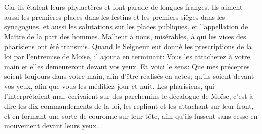 Car ils étalent leurs phylactères et font parade de longues franges.
Ils aiment aussi les premières places dans les festins
	et les premiers sièges dans les synagogues,
	et aussi les salutations sur les places publiques,
	et l’appellation de Maître de la part des hommes.
Malheur à nous, misérables, à qui les vices des pharisiens ont été transmis.
Quand le Seigneur eut donné les prescriptions de la loi
		par l’entremise de Moïse,
	il ajouta en terminant:
	Vous les attacherez à votre main et elles demeureront devant vos yeux.
Et voici le sens:
	Que mes préceptes soient toujours dans votre main,
		afin d’être réalisés en actes;
	qu’ils soient devant vos yeux, afin que vous les méditiez jour et nuit.
Les pharisiens, qui l’interprétaient mal,
	écrivaient sur des parchemins le décalogue de Moïse,
	c’est-à-dire les dix commandements de la loi,
	les repliant et les attachant sur leur front,
	et en formant une sorte de couronne sur leur tête,
	afin qu’ils fussent sans cesse en mouvement devant leurs yeux.
